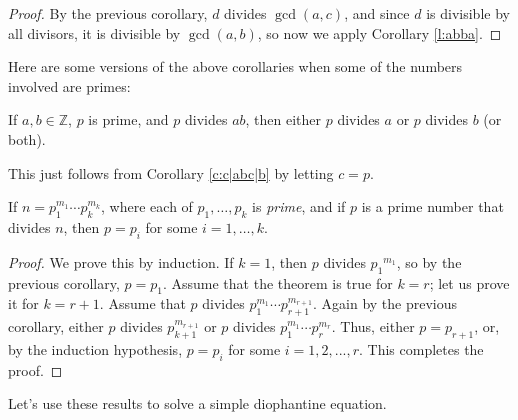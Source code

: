 \documentclass[11pt,dvipsnames]{book}
\numberwithin{equation}{section} %
\numberwithin{figure}{section} %
\numberwithin{table}{section} %
\begin{document}
\begin{proof}
By the previous corollary, $d$ divides $\gcd(a,c)$, and since $d$ is divisible by all divisors, it is divisible by $\gcd(a,b)$, so now we apply Corollary \ref{l:abba}.
\end{proof}


Here are some versions of the above corollaries when some of the numbers involved are primes:

\begin{corollary}
\label{c:p|ab}
If $a,b\in\mathbb{Z}$, $p$ is prime, and $p$ divides $ab$, then either $p$ divides $a$ or $p$ divides $b$ (or both).
\end{corollary}

This just follows from Corollary \ref{c:c|abc|b} by letting $c=p$. 







%  
 \begin{corollary}
 \label{c:p|p...p}
If $n=p_1^{m_1}\cdots p_k^{m_k}$, where each of $p_1,\dots,p_k$ is \emph{prime}, and if $p$ is a prime number that divides $n$, then $p=p_i$ for some $i=1,\ldots, k$.
\end{corollary}
 
\begin{proof}
We prove this by induction.
If $k=1$, then $p$ divides ${p_1}^{m_1}$, so by the previous corollary, $p=p_1$.
Assume that the theorem is true for $k=r$; let us prove it for $k=r+1$.
Assume that $p$ divides $p_{1}^{m_1}\cdots p_{r+1}^{m_{r+1}}$.
Again by the previous corollary, either $p$ divides $p_{k+1}^{m_{r+1}}$ or $p$ divides $p_1^{m_1}\cdots p_r^{m_r}$.
Thus, either $p=p_{r+1}$, or, by the induction hypothesis, $p=p_i$ for some $i=1,2,...,r$. This completes the proof.
\end{proof}
 
 
 Let's use these results to solve a simple diophantine equation. 
 
\end{document}

